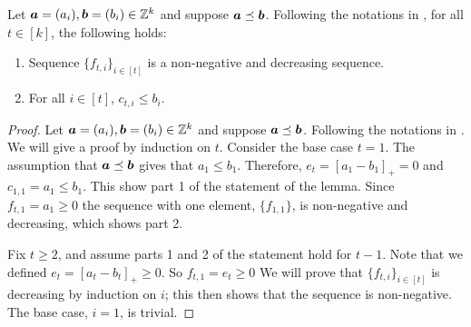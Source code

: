 \documentclass[runningheads]{llncs}
\begin{document}
\begin{lemma}\label{lemma: non-neg seq}
Let $\boldsymbol a =(a_i), \boldsymbol b = (b_i)\in\mathbb Z^k$ and suppose $\boldsymbol a\preceq\boldsymbol b$. 
Following the notations in , for all $t\in[k]$, the following holds:
\begin{enumerate}
    \item Sequence $\{f_{t,i}\}_{i\in[t]}$ is a non-negative and decreasing sequence. 
    \item For all $i\in[t]$, $c_{t,i}\leq b_i$.
\end{enumerate}
\end{lemma}
\begin{proof}
Let $\boldsymbol a =(a_i), \boldsymbol b = (b_i)\in\mathbb Z^k$ and suppose $\boldsymbol a\preceq\boldsymbol b$. Following the notations in .
We will give a proof by induction on $t$.
Consider the base case $t=1$. 
The assumption that $\boldsymbol a\preceq\boldsymbol b$ gives that $a_1 \leq b_1.$ 
Therefore, $e_t = [a_1 - b_1]_+ = 0$ and $c_{1,1} = a_1\leq b_1$. 
This show part 1 of the statement of the lemma. Since $f_{t,1}=a_1\geq 0$ the sequence with one element, $\{f_{1,1}\}$, is non-negative and decreasing, which shows part 2.

Fix $t\geq 2$, and assume parts 1 and 2 of the statement hold for $t-1$.
Note that we defined $e_t = [a_t - b_t]_+\geq 0$. So $f_{t,1} = e_t \geq 0$
We will prove that $\{f_{t,i}\}_{i\in[t]}$ is decreasing by induction on $i$; this then shows that the sequence is non-negative.
The base case, $i=1$, is trivial.


\end{proof}
\end{document}
